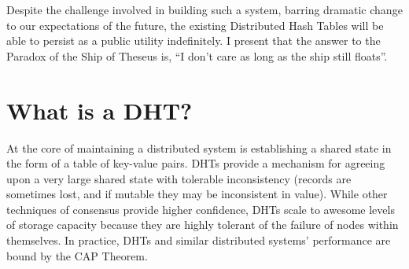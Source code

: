 Despite the challenge involved in building such a system, barring dramatic change to our expectations of the future, the existing Distributed Hash Tables will be able to persist as a public utility indefinitely.
I present that the answer to the Paradox of the Ship of Theseus is, ``I don't care as long as the ship still floats''.









\section{What is a DHT?}
At the core of maintaining a distributed system is establishing a shared state in the form of a table of key-value pairs.
DHTs provide a mechanism for agreeing upon a very large shared state with tolerable inconsistency (records are sometimes lost, and if mutable they may be inconsistent in value).
While other techniques of consensus provide higher confidence, DHTs scale to awesome levels of storage capacity because they are highly tolerant of the failure of nodes within themselves.
In practice, DHTs and similar distributed systems' performance are bound by the CAP Theorem\cite{brewer2010certain}.


